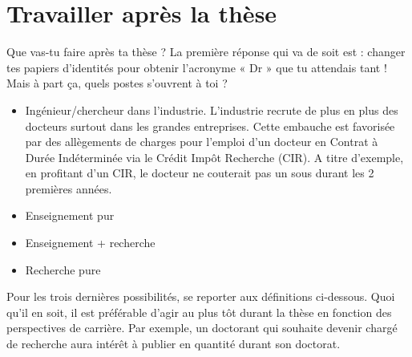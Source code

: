 \section{Travailler après la thèse}\trad
Que vas-tu faire après ta thèse ?
La première réponse qui va de soit est : changer tes papiers d'identités pour obtenir l'acronyme « Dr » que tu attendais tant !
Mais à part ça, quels postes s'ouvrent à toi ?
\begin{itemize}
  \item Ingénieur/chercheur dans l'industrie. L'industrie recrute de plus en plus des docteurs surtout dans les grandes entreprises. Cette embauche est favorisée par des allègements de charges pour l'emploi d'un docteur en Contrat à Durée Indéterminée via le Crédit Impôt Recherche (CIR). A titre d'exemple, en profitant d'un CIR, le docteur ne couterait pas un sous durant les 2 premières années.
  \item Enseignement pur
  \item Enseignement + recherche
  \item Recherche pure
\end{itemize}

Pour les trois dernières possibilités, se reporter aux définitions ci-dessous.
Quoi qu'il en soit, il est préférable d'agir au plus tôt durant la thèse en fonction des perspectives de carrière.
Par exemple, un doctorant qui souhaite devenir chargé de recherche aura intérêt à publier en quantité durant son doctorat.
